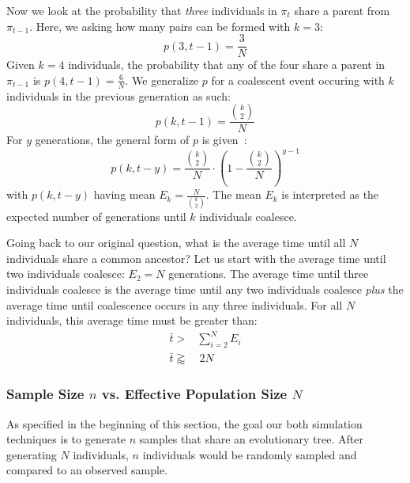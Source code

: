 Now we look at the probability that \emph{three} individuals in $\pi_t$ share a parent from $\pi_{t-1}$.
Here, we asking how many pairs can be formed with $k=3$:
\begin{equation}
    p(3, t-1) = \frac{3}{N}
\end{equation}
Given $k=4$ individuals, the probability that any of the four share a parent in $\pi_{t-1}$ is
$p(4, t-1) = \frac{6}{N}$.
We generalize $p$ for a coalescent event occuring with $k$ individuals in the previous generation as such:
\begin{equation}
    p(k, t-1) = \frac{\binom{k}{2}}{N}
\end{equation}
For $y$ generations, the general form of $p$ is given~\cite{hudsonGeneGenealogiesCoalescent1990}:
\begin{equation}
    p(k, t-y) = \frac{\binom{k}{2}}{N} \cdot \left(1 - \frac{\binom{k}{2}}{N}\right)^{y-1}
\end{equation}
with $p(k, t-y)$ having mean $E_k = \frac{N}{\binom{k}{2}}$.
The mean $E_k$ is interpreted as the expected number of generations until $k$ individuals coalesce.

Going back to our original question, what is the average time until all $N$ individuals share a common ancestor?
Let us start with the average time until two individuals coalesce: $E_2 = N$ generations.
The average time until three individuals coalesce is the average time until any two individuals coalesce \emph{plus} the
average time until coalescence occurs in any three individuals.
For all $N$ individuals, this average time must be greater than:
\begin{equation}
    \begin{aligned}
        \bar{t} >& \sum_{i=2}^{N} E_i \\
        \bar{t} \gtrapprox& \ 2N
    \end{aligned}
\end{equation}

\subsubsection{Sample Size $n$ vs. Effective Population Size $N$}
As specified in the beginning of this section, the goal our both simulation techniques is to generate $n$ samples that
share an evolutionary tree.
After generating $N$ individuals, $n$ individuals would be randomly sampled and compared to an observed sample.


